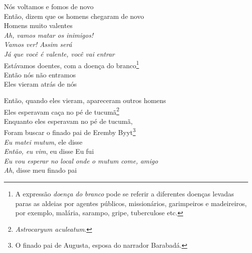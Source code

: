 \begin{linenumbers}\begingroup\raggedright
 
\noindent   Nós voltamos e fomos de novo\\
  Então, dizem que os homens chegaram de novo\\
  Homens muito valentes\\
  \emph{Ah, vamos matar os inimigos!}\\
  \emph{Vamos ver! Assim será}\\
  \emph{Já que você é valente, você vai entrar}\\
  Estávamos doentes, com a doença do branco\footnote{A expressão
   \emph{doença do branco} pode se referir a diferentes doenças levadas
   paras as aldeias por agentes públicos, missionários, garimpeiros e
   madeireiros, por exemplo, malária, sarampo, gripe, tuberculose etc.}\\
  Então nós não entramos\\
  Eles vieram atrás de nós
 
\end{linenumbers}\endgroup

\bigskip

\begin{linenumbers}\begingroup\raggedright
 
\noindent   Então, quando eles vieram, apareceram outros homens\\
  Eles esperavam caça no pé de tucumã\footnote{\emph{Astrocaryum
   aculeatum}.}\\
  Enquanto eles esperavam no pé de tucumã,\\
  Foram buscar o finado pai de Eremby Byyt\footnote{O finado pai de
   Augusta, esposa do narrador Barabadá.}\\
  \emph{Eu matei mutum}, ele disse\\
  \emph{Então, eu vim}, eu disse
  Eu fui\\
  \emph{Eu vou esperar no local onde o mutum come, amigo}\\
  \emph{Ah}, disse meu finado pai
 
\end{linenumbers}\endgroup

